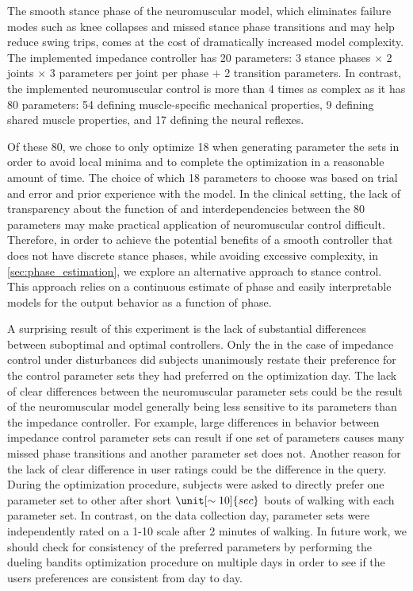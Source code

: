 The smooth stance phase of the neuromuscular model, which eliminates failure
modes such as knee collapses and missed stance phase transitions and may help
reduce swing trips, comes at the cost of dramatically increased model
complexity. The implemented impedance controller has 20 parameters: 3 stance
phases $\times$ 2 joints $\times$ 3 parameters per joint per phase $+$ 2
transition parameters. In contrast, the implemented neuromuscular control is
more than 4 times as complex as it has 80 parameters: 54 defining
muscle-specific mechanical properties, 9 defining shared muscle properties, and
17 defining the neural reflexes. 

Of these 80, we chose to only optimize 18 when generating parameter the sets in
order to avoid local minima and to complete the optimization in a reasonable
amount of time. The choice of which 18 parameters to choose was based on trial
and error and prior experience with the model. In the clinical setting, the lack
of transparency about the function of and interdependencies between the 80
parameters may make practical application of neuromuscular control difficult.
Therefore, in order to achieve the potential benefits of a smooth controller
that does not have discrete stance phases, while avoiding excessive complexity,
in \cref{sec:phase_estimation}, we explore an alternative approach to stance
control. This approach relies on a continuous estimate of phase and easily
interpretable models for the output behavior as a function of phase.

A surprising result of this experiment is the lack of substantial differences
between suboptimal and optimal controllers. Only the in the case of impedance
control under disturbances did subjects unanimously restate their preference for
the control parameter sets they had preferred on the optimization day. The lack
of clear differences between the neuromuscular parameter sets could be the
result of the neuromuscular model generally being less sensitive to its
parameters than the impedance controller. For example, large differences in
behavior between impedance control parameter sets can result if one set of
parameters causes many missed phase transitions and another parameter set does
not. Another reason for the lack of clear difference in user ratings could be
the difference in the query. During the optimization procedure, subjects were
asked to directly prefer one parameter set to other after short
$\unit[\sim10]{sec}$ bouts of walking with each parameter set. In contrast, on
the data collection day, parameter sets were independently rated on a 1-10 scale
after 2 minutes of walking. In future work, we should check for consistency of
the preferred parameters by performing the dueling bandits optimization
procedure on multiple days in order to see if the users preferences are
consistent from day to day.

